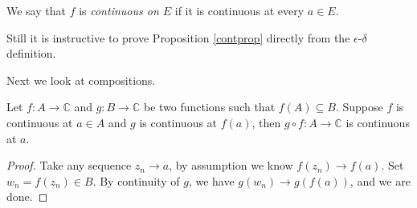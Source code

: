 \begin{note}
    We say that \(f\) is \textit{continuous on \(E\)} if it is continuous at every \(a \in E\).
\end{note}
\begin{remark}
    Still it is instructive to prove Proposition \eqref{contprop} directly from the \(\epsilon\)-\(\delta\) definition.
\end{remark}
Next we look at compositions.
\begin{theorem}{}{}
    Let \(f: A \to \mathbb{C}\) and \(g: B \to \mathbb{C}\) be two functions such that \(f(A) \subseteq B\). Suppose \(f\) is continuous at \(a \in A\) and \(g\) is continuous at \(f(a)\), then \(g\circ f: A \to \mathbb{C}\) is continuous at \(a\).
\end{theorem}
\begin{proof}
    Take any sequence \(z_n \to a\), by assumption we know \(f(z_n) \to f(a)\). Set \(w_n = f(z_n) \in B\). By continuity of \(g\), we have \(g(w_n) \to g(f(a))\), and we are done.
\end{proof}
